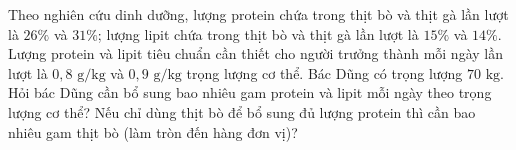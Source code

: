 \begin{bt}%
Theo nghiên cứu dinh dưỡng, lượng protein chứa trong thịt bò và thịt gà lần lượt là $26\%$ và $31\%$; lượng lipit chứa trong thịt bò và thịt gà lần lượt là $15\%$ và $14\%$. Lượng protein và lipit tiêu chuẩn cần thiết cho người trưởng thành mỗi ngày lần lượt là $0{,}8\text{ g/kg}$ và $0{,}9\text{ g/kg}$ trọng lượng cơ thể. Bác Dũng có trọng lượng $70\text{ kg}$. Hỏi bác Dũng cần bổ sung bao nhiêu gam protein và lipit mỗi ngày theo trọng lượng cơ thể? Nếu chỉ dùng thịt bò để bổ sung đủ lượng protein thì cần bao nhiêu gam thịt bò (làm tròn đến hàng đơn vị)?
\end{bt}

